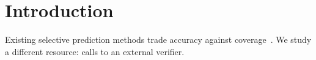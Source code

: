 \section{Introduction}\label{sec:intro}
Existing selective prediction methods trade accuracy against coverage~\cite{selective2017}. We study a different resource: calls to an external verifier.
